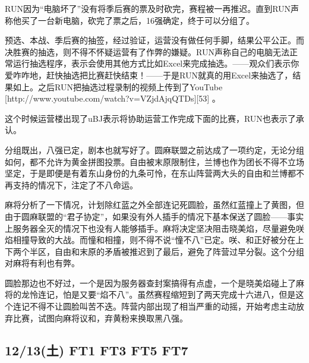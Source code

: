RUN因为“电脑坏了”没有将季后赛的票及时砍完，赛程被一再推迟。直到RUN声称他买了一台新电脑，砍完了票之后，16强确定，终于可以分组了。

预选、本战、季后赛的抽签，经过验证，运营没有做任何手脚，结果公平公正。而决胜赛的抽选，则不得不怀疑运营有了作弊的嫌疑。RUN声称自己的电脑无法正常运行抽选程序，表示会使用其他方式比如Excel来完成抽选。——观众们表示你爱咋咋地，赶快抽选把比赛赶快结束！——于是RUN就真的用Excel来抽选了，结果如上。之后RUN把抽选过程录制的视频上传到了YouTube [http://www.youtube.com/watch?v=VZjdAjqQTDs][53] 。

这个时候运营楼出现了uBJ表示将协助运营工作完成下面的比赛，RUN也表示了承认。

分组既出，八强已定，剧本也就写好了。圆麻联盟之前达成了一项约定，无论分组如何，都不允许为黄金拼图投票。自由被末原限制住，兰博也作为团长不得不立场坚定，于是即便是有着东山身份的九条可怜，在东山阵营两大头的自由和兰博都不再支持的情况下，注定了不八命运。

麻将分析了一下情况，计划除红蓝之外全部连记死圆脸，虽然红蓝撞上了黄图，但由于圆麻联盟的“君子协定”，如果没有外人插手的情况下基本保送了圆脸——事实上服务器全灭的情况下也没有人能够插手。麻将决定坚决阻击晓美焰，尽量避免咲焰相撞导致的大战。而憧和相撞，则不得不说“憧不八”已定。咲、和正好被分在上下两个半区，自由和末原的矛盾被推迟到了最后，避免了阵营过早分裂。这个分组对麻将有利也有弊。

圆脸那边也不好过，一个是因为服务器查封案搞得有点虚，一个是晓美焰碰上了麻将的龙怜连记，怕是又要“焰不八”。虽然赛程缩短到了两天完成十六进八，但是这个连记不得不让圆脸叫苦不迭。阵营内部出现了相当严重的动摇，开始考虑主动放弃比赛，试图向麻将议和，弃黄粉来换取黑八强。

\subsection{12/13(土) FT1 FT3 FT5 FT7}

